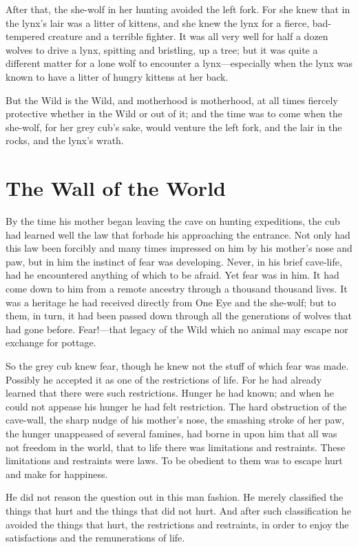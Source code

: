 \documentclass[10pt]{book}
\begin{document}
After that, the she-wolf in her hunting avoided the left fork. For she
knew that in the lynx’s lair was a litter of kittens, and she knew the
lynx for a fierce, bad-tempered creature and a terrible fighter. It was
all very well for half a dozen wolves to drive a lynx, spitting and
bristling, up a tree; but it was quite a different matter for a lone
wolf to encounter a lynx—especially when the lynx was known to have a
litter of hungry kittens at her back.

But the Wild is the Wild, and motherhood is motherhood, at all times
fiercely protective whether in the Wild or out of it; and the time was
to come when the she-wolf, for her grey cub’s sake, would venture the
left fork, and the lair in the rocks, and the lynx’s wrath.

\chapter{The Wall of the World}

By the time his mother began leaving the cave on hunting expeditions,
the cub had learned well the law that forbade his approaching the
entrance. Not only had this law been forcibly and many times impressed
on him by his mother’s nose and paw, but in him the instinct of fear
was developing. Never, in his brief cave-life, had he encountered
anything of which to be afraid. Yet fear was in him. It had come down
to him from a remote ancestry through a thousand thousand lives. It was
a heritage he had received directly from One Eye and the she-wolf; but
to them, in turn, it had been passed down through all the generations
of wolves that had gone before. Fear!—that legacy of the Wild which no
animal may escape nor exchange for pottage.

So the grey cub knew fear, though he knew not the stuff of which fear
was made. Possibly he accepted it as one of the restrictions of life.
For he had already learned that there were such restrictions. Hunger he
had known; and when he could not appease his hunger he had felt
restriction. The hard obstruction of the cave-wall, the sharp nudge of
his mother’s nose, the smashing stroke of her paw, the hunger
unappeased of several famines, had borne in upon him that all was not
freedom in the world, that to life there was limitations and
restraints. These limitations and restraints were laws. To be obedient
to them was to escape hurt and make for happiness.

He did not reason the question out in this man fashion. He merely
classified the things that hurt and the things that did not hurt. And
after such classification he avoided the things that hurt, the
restrictions and restraints, in order to enjoy the satisfactions and
the remunerations of life.
\end{document}
